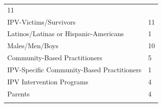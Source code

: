 \documentclass[]{tufte-handout}
\begin{document}
\begin{longtable}[]{@{}ll@{}}
\begin{minipage}[t]{0.21\columnwidth}
11\strut
\end{minipage}\tabularnewline
\begin{minipage}[t]{0.59\columnwidth}\raggedright\strut
IPV-Victims/Survivors\strut
\end{minipage} & \begin{minipage}[t]{0.21\columnwidth}\raggedright\strut
11\strut
\end{minipage}\tabularnewline
\begin{minipage}[t]{0.59\columnwidth}\raggedright\strut
Latinos/Latinas or Hispanic-Americans\strut
\end{minipage} & \begin{minipage}[t]{0.21\columnwidth}\raggedright\strut
1\strut
\end{minipage}\tabularnewline
\begin{minipage}[t]{0.59\columnwidth}\raggedright\strut
Males/Men/Boys\strut
\end{minipage} & \begin{minipage}[t]{0.21\columnwidth}\raggedright\strut
10\strut
\end{minipage}\tabularnewline
\begin{minipage}[t]{0.59\columnwidth}\raggedright\strut
Community-Based Practitioners\strut
\end{minipage} & \begin{minipage}[t]{0.21\columnwidth}\raggedright\strut
5\strut
\end{minipage}\tabularnewline
\begin{minipage}[t]{0.59\columnwidth}\raggedright\strut
IPV-Specific Community-Based Practitioners\strut
\end{minipage} & \begin{minipage}[t]{0.21\columnwidth}\raggedright\strut
1\strut
\end{minipage}\tabularnewline
\begin{minipage}[t]{0.59\columnwidth}\raggedright\strut
IPV Intervention Programs\strut
\end{minipage} & \begin{minipage}[t]{0.21\columnwidth}\raggedright\strut
4\strut
\end{minipage}\tabularnewline
\begin{minipage}[t]{0.59\columnwidth}\raggedright\strut
Parents\strut
\end{minipage} & \begin{minipage}[t]{0.21\columnwidth}\raggedright\strut
4\strut
\end{minipage}\tabularnewline
\begin{minipage}[t]{0.59\columnwidth}\raggedright\strut

\end{minipage}
\end{longtable}
\end{document}
